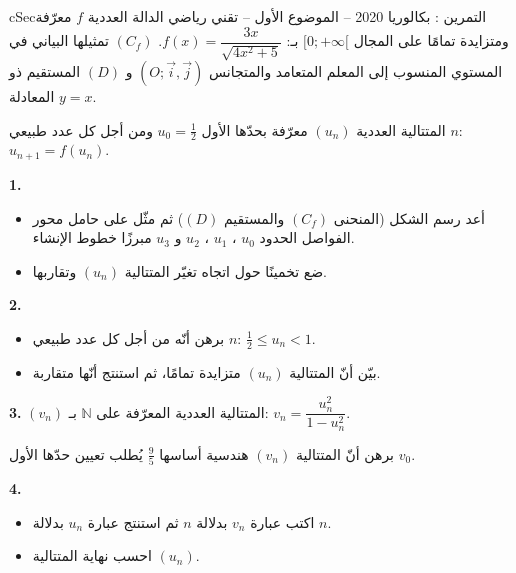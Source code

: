 \documentclass[12pt,a4paper]{article}
\newenvironment{BOX}[2]{\begin{otherlanguage}{english}\begin{arbox}{#1}{#2}}{\end{arbox}\end{otherlanguage}}
\newcounter{exo}
\newenvironment{tamrin}[1]{\stepcounter{exo}\begin{BOX}{cSec}{التمرين \theexo: #1}}{\end{BOX}}
\newcommand{\N}{\mathbb{N}}
\newenvironment{sq}{\begin{itemize}[leftmargin=2.4em,itemsep=3pt]}{\end{itemize}}
\newcommand{\qa}{\item[(أ)]}\newcommand{\qb}{\item[(ب)]}\newcommand{\qc}{\item[(جـ)]}\newcommand{\qd}{\item[(د)]}\newcommand{\qe}{\item[(هـ)]}
\begin{document}
\begin{tamrin}{بكالوريا 2020 -- الموضوع الأول -- تقني رياضي}
الدالة العددية $f$ معرّفة ومتزايدة تمامًا على المجال $[0;+\infty[$ بـ: $f(x)=\dfrac{3x}{\sqrt{4x^2+5}}$. $(C_f)$ تمثيلها البياني في المستوي المنسوب إلى المعلم المتعامد والمتجانس $\left(O;\vec i,\vec j\right)$ و $(D)$ المستقيم ذو المعادلة $y=x$.

المتتالية العددية $(u_n)$ معرّفة بحدّها الأول $u_0=\frac12$ ومن أجل كل عدد طبيعي $n$: $u_{n+1}=f(u_n)$.

\textbf{1.}
\begin{sq}
\qa أعد رسم الشكل (المنحنى $(C_f)$ والمستقيم $(D)$) ثم مثّل على حامل محور الفواصل الحدود $u_0$ ، $u_1$ ، $u_2$ و $u_3$ مبرزًا خطوط الإنشاء.
\qb ضع تخمينًا حول اتجاه تغيّر المتتالية $(u_n)$ وتقاربها.
\end{sq}
\textbf{2.}
\begin{sq}
\qa برهن أنّه من أجل كل عدد طبيعي $n$: $\frac12\le u_n<1$.
\qb بيّن أنّ المتتالية $(u_n)$ متزايدة تمامًا، ثم استنتج أنّها متقاربة.
\end{sq}
\textbf{3.} $(v_n)$ المتتالية العددية المعرّفة على $\N$ بـ: $v_n=\dfrac{u_n^2}{1-u_n^2}$.

برهن أنّ المتتالية $(v_n)$ هندسية أساسها $\frac95$ يُطلب تعيين حدّها الأول $v_0$.

\textbf{4.}
\begin{sq}
\qa اكتب عبارة $v_n$ بدلالة $n$ ثم استنتج عبارة $u_n$ بدلالة $n$.
\qb احسب نهاية المتتالية $(u_n)$.
\end{sq}
\end{tamrin}
\end{document}
